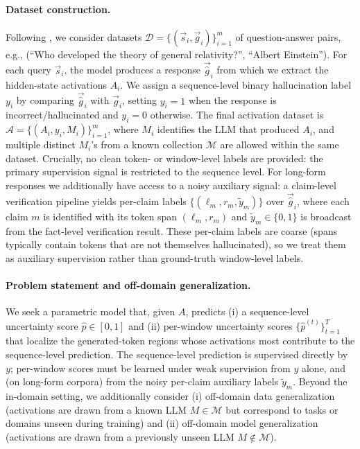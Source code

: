 \paragraph{Dataset construction.} Following \citet{orgad2024}, we consider datasets $\mathcal{D} = \{(\vec{s}_i, \vec{g}_i)\}_{i=1}^m$ of question-answer pairs, e.g., (``Who developed the theory of general relativity?'', ``Albert Einstein''). For each query $\vec{s}_i$, the model produces a response $\vec{\hat{g}}_i$ from which we extract the hidden-state activations $A_i$. We assign a sequence-level binary hallucination label $y_i$ by comparing $\vec{\hat{g}}_i$ with $\vec{g}_i$, setting $y_i = 1$ when the response is incorrect/hallucinated and $y_i = 0$ otherwise. The final activation dataset is $\mathcal{A} = \{(A_i, y_i, M_i)\}_{i=1}^m$, where $M_i$ identifies the LLM that produced $A_i$, and multiple distinct $M_i$'s from a known collection $\mathcal{M}$ are allowed within the same dataset. Crucially, no clean token- or window-level labels are provided: the primary supervision signal is restricted to the sequence level. For long-form responses we additionally have access to a noisy auxiliary signal: a claim-level verification pipeline yields per-claim labels $\{(\ell_m, r_m, \tilde{y}_m)\}$ over $\vec{\hat{g}}_i$, where each claim $m$ is identified with its token span $(\ell_m, r_m)$ and $\tilde{y}_m \in \{0, 1\}$ is broadcast from the fact-level verification result. These per-claim labels are coarse (spans typically contain tokens that are not themselves hallucinated), so we treat them as auxiliary supervision rather than ground-truth window-level labels.

\paragraph{Problem statement and off-domain generalization.} We seek a parametric model that, given $A$, predicts (i) a sequence-level uncertainty score $\hat{p} \in [0, 1]$ and (ii) per-window uncertainty scores $\{\hat{p}^{(t)}\}_{t=1}^{T}$ that localize the generated-token regions whose activations most contribute to the sequence-level prediction. The sequence-level prediction is supervised directly by $y$; per-window scores must be learned under weak supervision from $y$ alone, and (on long-form corpora) from the noisy per-claim auxiliary labels $\tilde{y}_m$. Beyond the in-domain setting, we additionally consider (i) off-domain data generalization (activations are drawn from a known LLM $M \in \mathcal{M}$ but correspond to tasks or domains unseen during training) and (ii) off-domain model generalization (activations are drawn from a previously unseen LLM $M \notin \mathcal{M}$).

